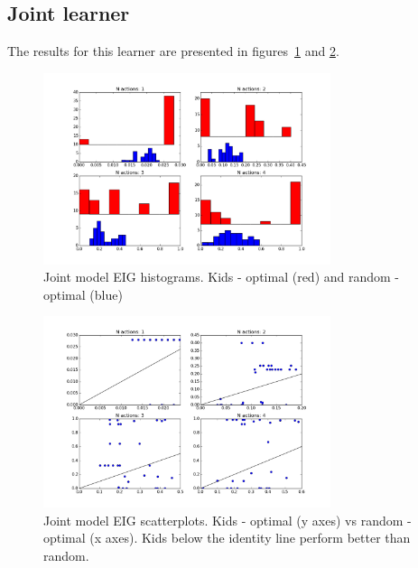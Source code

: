 \documentclass[11pt, a4paper]{article}
\begin{document}
\clearpage
\subsection*{Joint learner}
The results for this learner are presented in figures~\ref{fig:jh} and \ref{fig:js}.%

\begin{figure}[h!]
\begin{center}
\includegraphics[width=0.75\textwidth]{../Plots/IG_joint_hist.png}
\end{center}
\caption{Joint model EIG histograms. Kids - optimal (red) and random - optimal (blue)}
\label{fig:jh}
\end{figure}

\begin{figure}[h!]
\begin{center}
\includegraphics[width=0.75\textwidth]{../Plots/IG_joint_scat.png}
\end{center}
\caption{Joint model EIG scatterplots. Kids - optimal (y axes) vs random - optimal (x axes). Kids below the identity line perform better than random.}
\label{fig:js}
\end{figure}
\end{document}
